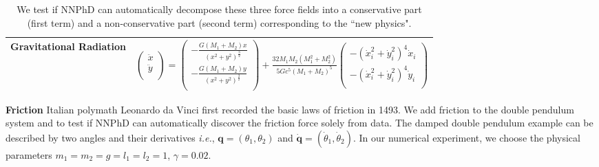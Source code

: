 \documentclass[aps,pre,reprint,superscriptaddress,nofootinbib,amsmath,amssymb]{revtex4-2}
\def\ie{{\frenchspacing\it i.e.}}
\newcommand{\mat}[1]{\mathbf{#1}}
\newcommand{\q}{\mat{q}}
\newcommand{\qd}{\dot{\mat{q}}}
\begin{document}
\begin{table*}[ht]
\begin{tabular}{|c|c|}
	Gravitational Radiation & $\begin{pmatrix}
		\ddot{x}\\
		\ddot{y}\\
	\end{pmatrix}=
	\begin{pmatrix}
		-\frac{G(M_1+M_2)x}{(x^2+y^2)^{\frac{3}{2}}}\\
		-\frac{G(M_1+M_2)y}{(x^2+y^2)^{\frac{3}{2}}}\\
	\end{pmatrix}
	+\frac{32M_1M_2(M_1^2+M_2^2)}{5Gc^5(M_1+M_2)^5}
	\begin{pmatrix}
		-(\dot{x}_i^2+\dot{y}_i^2)^{4}\dot{x}_i\\
		-(\dot{x}_i^2+\dot{y}_i^2)^{4}\dot{y}_i\\
	\end{pmatrix}
	$ \\\hline
    \end{tabular}
    \caption{We test if NNPhD can automatically decompose these three force fields into a conservative part (first term) and a non-conservative part (second term) corresponding to the ``new physics".}
    \label{tab:four_new_physics_equations}
\end{table*}




{\bf Friction} Italian polymath Leonardo da Vinci first recorded the basic laws of friction in 1493. We add friction to the double pendulum system and to test if NNPhD can automatically discover the friction force solely from data. The damped double pendulum example can be described by two angles and their derivatives \ie, 
$\q=(\theta_1,\theta_2)$ and $\qd=(\dot{\theta}_1,\dot{\theta}_2)$.
In our numerical experiment, we choose the physical parameters $m_1=m_2=g=l_1=l_2=1$, 
$\gamma=0.02$.
\end{document}
